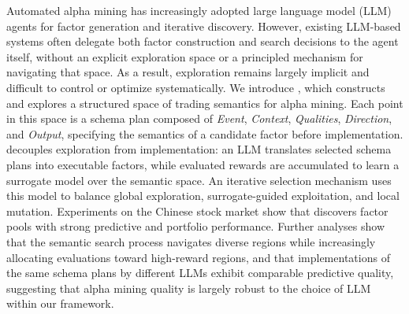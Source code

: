 Automated alpha mining has increasingly adopted large language model
(LLM) agents for factor generation and iterative discovery. However,
existing LLM-based systems often delegate both factor construction and
search decisions to the agent itself, without an explicit exploration
space or a principled mechanism for navigating that space. As a result, exploration remains largely implicit and difficult to control or optimize
systematically. We introduce \method{}, which constructs and explores a structured space
of trading semantics for alpha mining. Each point in this space is a
schema plan composed of \emph{Event}, \emph{Context}, \emph{Qualities},
\emph{Direction}, and \emph{Output}, specifying the semantics of a
candidate factor before implementation. \method{} decouples exploration
from implementation: an LLM translates selected schema plans into
executable factors, while evaluated rewards are accumulated to learn a
surrogate model over the semantic space. An iterative selection mechanism uses
this model to balance global exploration, surrogate-guided exploitation,
and local mutation. Experiments on the Chinese stock market show that \method{} discovers
factor pools with strong predictive and portfolio performance. Further analyses show that the semantic search process navigates diverse regions while increasingly allocating evaluations toward high-reward regions, and that implementations of the same schema plans by different LLMs
exhibit comparable predictive quality, suggesting that alpha mining quality is largely robust to the choice of LLM within our framework.
